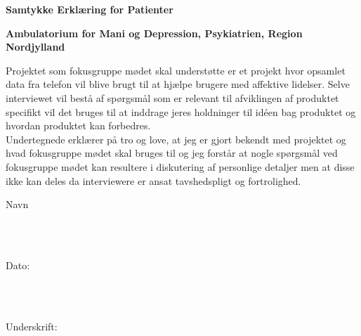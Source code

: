 


\vspace{5cm}

{\centering \Large \textbf{Samtykke Erklæring for Patienter} \\ \vspace{2cm}}

{\centering \large \textbf{Ambulatorium for Mani og Depression, Psykiatrien, Region Nordjylland} \\ \vspace{2cm}}


\noindent
Projektet som fokusgruppe mødet skal understøtte er et projekt hvor opsamlet data fra telefon vil blive brugt til at hjælpe brugere med affektive lidelser. Selve interviewet vil bestå af spørgsmål som er relevant til afviklingen af produktet specifikt vil det bruges til at inddrage jeres holdninger til idéen bag produktet og hvordan produktet kan forbedres. \\ 

\noindent
Undertegnede erklærer på tro og love, at jeg er gjort bekendt med projektet og hvad fokusgruppe mødet skal bruges til og jeg forstår at nogle spørgsmål ved fokusgruppe mødet kan resultere i diskutering af personlige detaljer men at disse ikke kan deles da interviewere er ansat tavshedspligt og fortrolighed.

\vspace{1cm}
\noindent
\vspace{5mm}
\parbox[h]{2cm}{Navn}\hspace{0.5cm} \makebox[7cm]{\hrulefill} \\ \\
\vspace{5mm}
\parbox[h]{2cm}{Dato:}\hspace{0.5cm} \makebox[7cm]{\hrulefill} \\ \\
\vspace{5mm}
\parbox[h]{2cm}{Underskrift: }\hspace{0.5cm} \makebox[7cm]{\hrulefill} \\ \\
\vspace{5mm}

